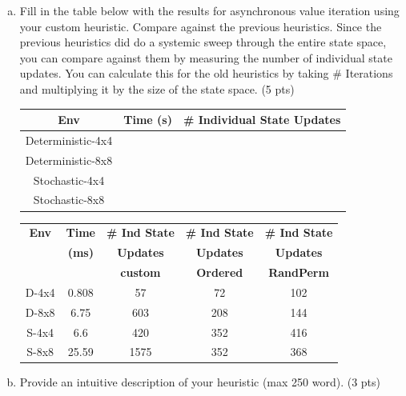 \documentclass[12pt]{article}
\begin{document}
\begin{enumerate}[a)]
\item Fill in the table below with the results for asynchronous value iteration using your custom heuristic. Compare against the previous heuristics. Since the previous heuristics did do a systemic sweep through the entire state space, you can compare against them by measuring the number of individual state updates. You can calculate this for the old heuristics by taking \# Iterations and multiplying it by the size of the state space. (5 pts)
\begin{center}
  \begin{tabular}{|c|c|c|}\hline
    {\bf Env} & {\bf Time (s)} & {\bf \# Individual State Updates} \\ \hline
    Deterministic-4x4 & & \\ \hline
    Deterministic-8x8 & & \\ \hline
    Stochastic-4x4    & & \\ \hline
    Stochastic-8x8    & & \\ \hline
  \end{tabular}
\end{center}

\begin{solution}
\begin{center}
  \begin{tabular}{|c|c|c|c|c|}\hline
    {\bf Env} & {\bf Time} & {\bf \# Ind State} & {\bf \# Ind State} & {\bf \# Ind State} \\
    {\bf} & {\bf (ms)} & {\bf Updates} & {\bf Updates} & {\bf Updates} \\ 
    {\bf} & {} & {\bf custom} & {\bf Ordered} & {\bf RandPerm} \\ \hline
    D-4x4 & 0.808 & 57 & 72 & 102 \\ \hline
    D-8x8 & 6.75 & 603 & 208 & 144 \\ \hline
    S-4x4 & 6.6 & 420 & 352 & 416 \\ \hline
    S-8x8 & 25.59 & 1575 & 352 & 368 \\ \hline
  \end{tabular}
\end{center}
\end{solution}

\item Provide an intuitive description of your heuristic (max 250 word). (3 pts)


\end{enumerate}
\end{document}
